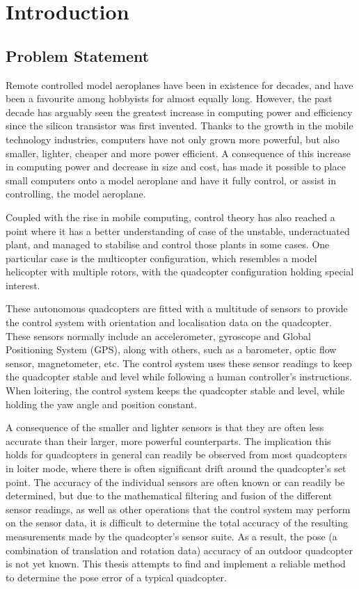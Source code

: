 \chapter{Introduction}

\section{Problem Statement}
\label{sec:problem-statement}

Remote controlled model aeroplanes have been in existence for decades, and have been a favourite among hobbyists for almost equally long. However, the past decade has arguably seen the greatest increase in computing power and efficiency since the silicon transistor was first invented. Thanks to the growth in the mobile technology industries, computers have not only grown more powerful, but also smaller, lighter, cheaper and more power efficient. A consequence of this increase in computing power and decrease in size and cost, has made it possible to place small computers onto a model aeroplane and have it fully control, or assist in controlling, the model aeroplane. 

Coupled with the rise in mobile computing, control theory has also reached a point where it has a better understanding of case of the unstable, underactuated plant, and managed to stabilise and control those plants in some cases. One particular case is the multicopter configuration, which resembles a model helicopter with multiple rotors, with the quadcopter configuration holding special interest. 

These autonomous quadcopters are fitted with a multitude of sensors to provide the control system with orientation and localisation data on the quadcopter. These sensors normally include an accelerometer, gyroscope and Global Positioning System (GPS), along with others, such as a barometer, optic flow sensor, magnetometer, etc. The control system uses these sensor readings to keep the quadcopter stable and level while following a human controller's instructions. When loitering, the control system keeps the quadcopter stable and level, while holding the yaw angle and position constant. 

A consequence of the smaller and lighter sensors is that they are often less accurate than their larger, more powerful counterparts. The implication this holds for quadcopters in general can readily be observed from most quadcopters in loiter mode, where there is often significant drift around the quadcopter's set point. The accuracy of the individual sensors are often known or can readily be determined, but due to the mathematical filtering and fusion of the different sensor readings, as well as other operations that the control system may perform on the sensor data, it is difficult to determine the total accuracy of the resulting measurements made by the quadcopter's sensor suite. As a result, the pose (a combination of translation and rotation data) accuracy of an outdoor quadcopter is not yet known. This thesis attempts to find and implement a reliable method to determine the pose error of a typical quadcopter.  

